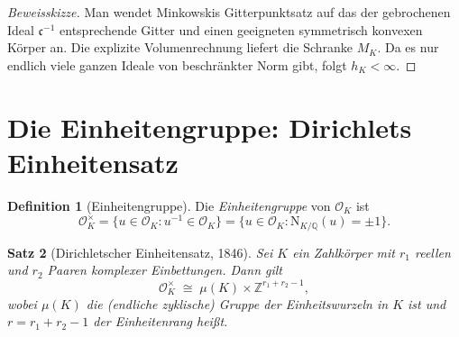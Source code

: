 \documentclass[12pt,a4paper]{amsart}
\newtheorem{theorem}{Satz}[section]
\theoremstyle{definition}
\newtheorem{definition}[theorem]{Definition}
\newcommand{\Z}{\mathbb{Z}}
\newcommand{\Q}{\mathbb{Q}}
\newcommand{\OK}{\mathcal{O}_K}
\begin{document}
\begin{proof}[Beweisskizze]
Man wendet Minkowskis Gitterpunktsatz auf das der gebrochenen Ideal
$\mathfrak{c}^{-1}$ entsprechende Gitter und einen geeigneten symmetrisch
konvexen Körper an.  Die explizite Volumenrechnung liefert die Schranke $M_K$.
Da es nur endlich viele ganzen Ideale von beschränkter Norm gibt, folgt
$h_K < \infty$.
\end{proof}

\section{Die Einheitengruppe: Dirichlets Einheitensatz}

\begin{definition}[Einheitengruppe]
Die \emph{Einheitengruppe} von $\OK$ ist
\[
  \OK^\times = \{u \in \OK : u^{-1} \in \OK\}
  = \{u \in \OK : \mathrm{N}_{K/\Q}(u) = \pm 1\}.
\]
\end{definition}

\begin{theorem}[Dirichletscher Einheitensatz, 1846]
\label{thm:einheitensatz}
Sei $K$ ein Zahlkörper mit $r_1$ reellen und $r_2$ Paaren komplexer
Einbettungen.  Dann gilt
\[
  \OK^\times \;\cong\; \mu(K) \times \Z^{r_1 + r_2 - 1},
\]
wobei $\mu(K)$ die (endliche zyklische) Gruppe der Einheitswurzeln in $K$
ist und $r = r_1 + r_2 - 1$ der \emph{Einheitenrang} heißt.
\end{theorem}
\end{document}
